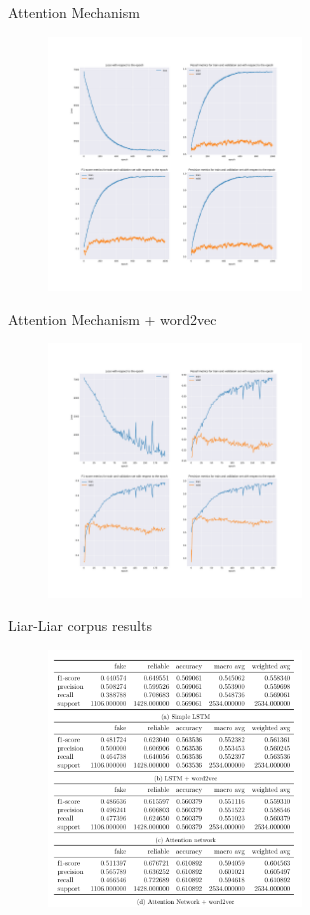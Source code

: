 \documentclass{beamer}
\begin{document}
	\begin{frame}{Attention Mechanism}
		\begin{figure}
			\centering
			\includegraphics[width=0.6\textwidth]{attention3.pdf}
		\end{figure}
	\end{frame}
	\begin{frame}{Attention Mechanism + word2vec}
	\begin{figure}
			\centering
			\includegraphics[width=0.6\textwidth]{attention1.pdf}
		\end{figure}
	\end{frame}
	\begin{frame}{Liar-Liar corpus results}
		\begin{figure}
		\centering
			\includegraphics[width=0.6\textwidth]{res4.png}
		\end{figure}
	\end{frame}
\end{document}
